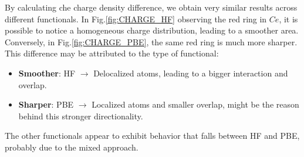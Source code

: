 \documentclass{article}
\begin{document}
By calculating che charge density difference, we obtain very similar results across different functionals. In Fig.\ref{fig:CHARGE_HF} observing the red ring in $Ce$, it is possible to notice a homogeneous charge distribution, leading to a smoother area. Conversely, in Fig.\ref{fig:CHARGE_PBE}, the same red ring is much more sharper. This difference may be attributed to the type of functional:
\begin{itemize}
	\item \textbf{Smoother}: HF $\rightarrow$ Delocalized atoms, leading to a bigger interaction and overlap.
	\item \textbf{Sharper}: PBE $\rightarrow$ Localized atoms and smaller overlap, might be the reason behind this stronger directionality. 
\end{itemize}
The other functionals appear to exhibit behavior that falls between HF and PBE, probably due to the mixed approach.

\vspace{15pt}
\end{document}
